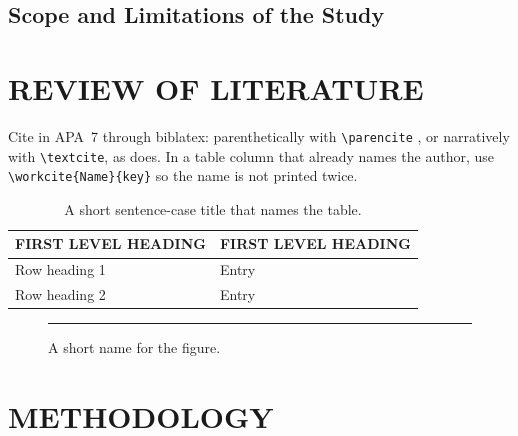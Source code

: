 \documentclass[12pt,a4paper]{article}
\begin{document}
\subsection{Scope and Limitations of the Study}

\section{REVIEW OF LITERATURE}
\label{sec:rrl}

Cite in APA~7 through \textsf{biblatex}: parenthetically with
\verb|\parencite| \parencite{daganzo1994}, or narratively with
\verb|\textcite|, as \textcite{daganzo1994} does. In a table column that
already names the author, use \verb|\workcite{Name}{key}| so the name is not
printed twice.

\begin{table}[H]
\centering
\small
\caption{A short sentence-case title that names the table.}
\label{tab:example}
\begin{tabularx}{\linewidth}{@{}P{3.2cm}L@{}}
\toprule
FIRST LEVEL HEADING & FIRST LEVEL HEADING \\
\midrule
Row heading 1 & Entry \\
Row heading 2 & Entry \\
\bottomrule
\end{tabularx}
\end{table}

\begin{figure}[htbp]
\centering
\rule{6cm}{3cm}                      %
\caption{A short name for the figure.}
\label{fig:example}
\end{figure}

\section{METHODOLOGY}
\label{sec:method}
\end{document}
